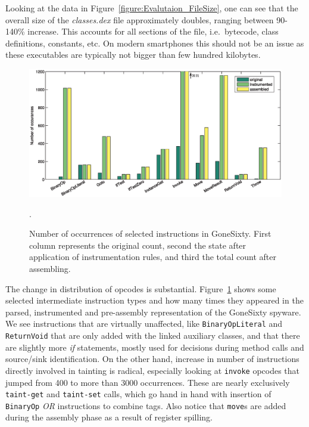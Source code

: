 \documentclass[12pt,twoside,notitlepage]{report}
\begin{document}
Looking at the data in Figure~\ref{figure:Evalutaion_FileSize}, one can see that the overall size of the \emph{classes.dex} file approximately doubles, ranging between 90-140\% increase. This accounts for all sections of the file, i.e.\ bytecode, class definitions, constants, etc. On modern smartphones this should not be an issue as these executables are typically not bigger than few hundred kilobytes.

\begin{figure}
	\centerline{	
		\includegraphics[width=\textwidth]{figs/fig_eval_codebloat.eps}
	}
	\caption{Number of occurrences of selected instructions in GoneSixty. First column represents the original count, second the state after application of instrumentation rules, and third the total count after assembling.}.
	\label{figure:Evalutaion_CodeBloat}
\end{figure}

The change in distribution of opcodes is substantial. Figure~\ref{figure:Evalutaion_CodeBloat} shows some selected intermediate instruction types and how many times they appeared in the parsed, instrumented and pre-assembly representation of the GoneSixty spyware. We see instructions that are virtually unaffected, like \verb$BinaryOpLiteral$ and \verb$ReturnVoid$ that are only added with the linked auxiliary classes, and that there are slightly more \emph{if} statements, mostly used for decisions during method calls and source/sink identification. On the other hand, increase in number of instructions directly involved in tainting is radical, especially looking at \verb$invoke$ opcodes that jumped from 400 to more than 3000 occurrences. These are nearly exclusively \verb$taint-get$ and \verb$taint-set$ calls, which go hand in hand with insertion of \verb$BinaryOp$ \emph{OR} instructions to combine tags. Also notice that \verb$move$s are added during the assembly phase as a result of register spilling.
\end{document}
